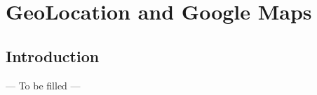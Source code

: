 \chapter{GeoLocation and Google Maps}
\label{GGM}

\section{Introduction}
\label{GGM:introduction}
--- To be filled ---
